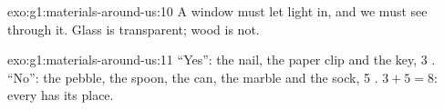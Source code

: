 \begin{solution}{exo:g1:materials-around-us:10}
A window must let light in, and we must see through it. Glass is
transparent; wood is not.
\end{solution}

\begin{solution}{exo:g1:materials-around-us:11}
``Yes'': the nail, the paper clip and the key, 3 . ``No'': the
pebble, the spoon, the can, the marble and the sock, 5 .
$3 + 5 = 8$: every  has its place.
\end{solution}
